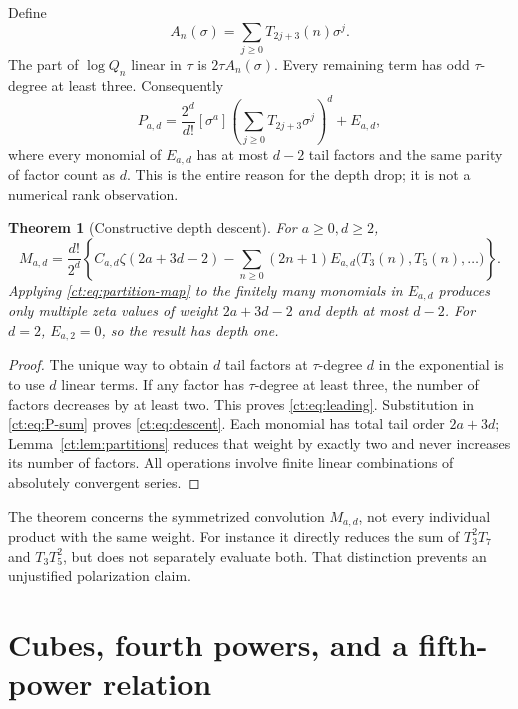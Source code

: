\documentclass[11pt]{article}
\numberwithin{equation}{section}
\newtheorem{theorem}{Theorem}[section]
\theoremstyle{definition}\newtheorem{definition}[theorem]{Definition}
\theoremstyle{remark}\newtheorem{remark}[theorem]{Remark}
\begin{document}
Define
\[
 A_n(\sigma)=\sum_{j\ge0}T_{2j+3}(n)\sigma^j.
\]
The part of $\log Q_n$ linear in $\tau$ is $2\tau A_n(\sigma)$.
Every remaining term has odd $\tau$-degree at least three. Consequently
\begin{equation}\label{ct:eq:leading}
 P_{a,d}=\frac{2^d}{d!}[\sigma^a]
          \left(\sum_{j\ge0}T_{2j+3}\sigma^j\right)^d+E_{a,d},
\end{equation}
where every monomial of $E_{a,d}$ has at most $d-2$ tail factors and the
same parity of factor count as $d$. This is the entire reason for the
depth drop; it is not a numerical rank observation.

\begin{theorem}[Constructive depth descent]\label{ct:thm:descent}
For $a\ge0,d\ge2$,
\begin{equation}\label{ct:eq:descent}
 M_{a,d}=\frac{d!}{2^d}\left\{
 C_{a,d}\zeta(2a+3d-2)
 -\sum_{n\ge0}(2n+1)E_{a,d}\bigl(T_3(n),T_5(n),\ldots\bigr)
 \right\}.
\end{equation}
Applying \eqref{ct:eq:partition-map} to the finitely many monomials in
$E_{a,d}$ produces only multiple zeta values of weight $2a+3d-2$ and depth
at most $d-2$. For $d=2$, $E_{a,2}=0$, so the result has depth one.
\end{theorem}
\begin{proof}
The unique way to obtain $d$ tail factors at $\tau$-degree $d$ in the
exponential is to use $d$ linear terms. If any factor has $\tau$-degree
at least three, the number of factors decreases by at least two. This
proves \eqref{ct:eq:leading}. Substitution in \eqref{ct:eq:P-sum} proves
\eqref{ct:eq:descent}. Each monomial has total tail order $2a+3d$;
Lemma~\ref{ct:lem:partitions} reduces that weight by exactly two and never
increases its number of factors. All operations involve finite linear
combinations of absolutely convergent series.
\end{proof}
The theorem concerns the symmetrized convolution $M_{a,d}$, not every
individual product with the same weight. For instance it directly reduces
the sum of $T_3^2T_7$ and $T_3T_5^2$, but does not separately evaluate both.
That distinction prevents an unjustified polarization claim.

\section{Cubes, fourth powers, and a fifth-power relation}
\label{ct:sec:examples}
\end{document}
